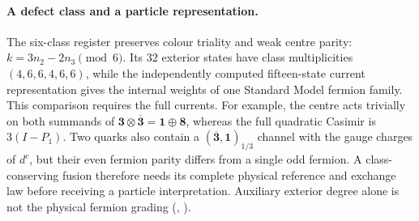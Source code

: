 \paragraph{A defect class and a particle representation.}
The six-class register preserves colour triality and weak centre parity:
$k=3n_2-2n_3\pmod6$. Its $32$ exterior states have class multiplicities
$(4,6,6,4,6,6)$, while the independently computed fifteen-state current
representation gives the internal weights of one Standard Model fermion
family. This comparison requires the full currents. For example, the
centre acts trivially on both summands of
$\mathbf3\otimes\overline{\mathbf3}=\mathbf1\oplus\mathbf8$, whereas the
full quadratic Casimir is $3(I-P_1)$. Two quarks also contain a
$(\overline{\mathbf3},\mathbf1)_{1/3}$ channel with the gauge charges of
$d^c$, but their even fermion parity differs from a single odd fermion.
A class-conserving fusion therefore needs its complete physical reference
and exchange law before receiving a particle interpretation. Auxiliary
exterior degree alone is not the physical fermion grading
(, \cite{ophrepo}).
